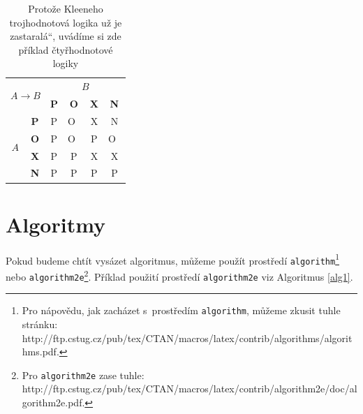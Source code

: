 \documentclass[11pt, a4paper]{article}
\providecommand{\uv}[1]{\quotedblbase #1\textquotedblleft}
\begin{document}
\begin{table}[h]
\begin{tabular}{|c|c|c|c|c|c|}
\hline
\multicolumn{2}{|c|}{\multirow{2}{*}{$A \rightarrow B$}} & \multicolumn{4}{c|}{$B$}                          \\ \cline{3-6} 
\multicolumn{2}{|c|}{}                                   & \textbf{P} & \textbf{O} & \textbf{X} & \textbf{N} \\ \hline
\multirow{4}{*}{$A$}             & \textbf{P}            & P          & O~& X          & N          \\ \cline{2-6} 
                                 & \textbf{O}            & P          & O~& P          & O~\\ \cline{2-6} 
                                 & \textbf{X}            & P          & P          & X          & X          \\ \cline{2-6} 
                                 & \textbf{N}            & P          & P          & P          & P          \\ \hline
\end{tabular}
\caption{Protože Kleeneho trojhodnotová logika už je \uv{zastaralá}, uvádíme si zde příklad čtyřhodnotové logiky}
\label{tab2}
\end{table}

\vspace{4.5mm}

\pagebreak

\section{Algoritmy}
\label{algoritmy}
Pokud budeme chtít vysázet algoritmus, můžeme použít prostředí \texttt{algorithm}\footnote{Pro nápovědu, jak zacházet s~prostředím \texttt{algorithm}, můžeme zkusit tuhle stránku: \\ http://ftp.cstug.cz/pub/tex/CTAN/macros/latex/contrib/algorithms/algorithms.pdf.} nebo \texttt{algorithm2e}\footnote{Pro \texttt{algorithm2e} zase tuhle:
http://ftp.cstug.cz/pub/tex/CTAN/macros/latex/contrib/algorithm2e/doc/algorithm2e.pdf.}.
\hbox{Příklad} použití prostředí \texttt{algorithm2e} viz Algoritmus \ref{alg1}.
\vspace{7mm}
\end{document}

